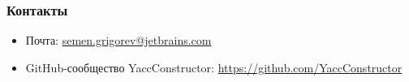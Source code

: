 \documentclass[xcolor=table,aspectratio=169]{beamer}
\begin{document}
            
\begin{frame}
\transwipe[direction=90]
\frametitle{Контакты}
\begin{itemize}
  \item Почта: \url{semen.grigorev@jetbrains.com}
  \item GitHub-сообщество YaccConstructor: \url{https://github.com/YaccConstructor}
\end{itemize}
\end{frame}
\end{document}
